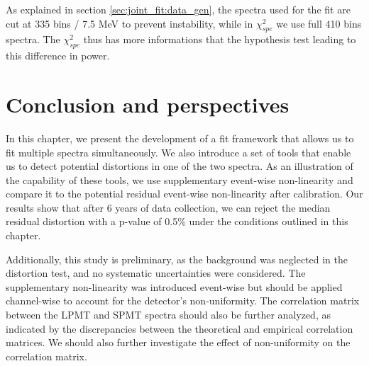 \documentclass[../main.tex]{subfiles}
\begin{document}
As explained in section \ref{sec:joint_fit:data_gen}, the spectra used for the fit are cut at 335 bins / 7.5 MeV to prevent instability, while in $\chi^2_{spe}$ we use full 410 bins spectra. The $\chi^2_{spe}$ thus has more informations that the hypothesis test leading to this difference in power.


%
%
%
%
%

\section{Conclusion and perspectives}
\label{sec:joint_fit:conclusion}

In this chapter, we present the development of a fit framework that allows us to fit multiple spectra simultaneously. We also introduce a set of tools that enable us to detect potential distortions in one of the two spectra. As an illustration of the capability of these tools, we use supplementary event-wise non-linearity and compare it to the potential residual event-wise non-linearity after calibration. Our results show that after 6 years of data collection, we can reject the median residual distortion with a p-value of 0.5\% under the conditions outlined in this chapter.

Additionally, this study is preliminary, as the background was neglected in the distortion test, and no systematic uncertainties were considered. The supplementary non-linearity was introduced event-wise but should be applied channel-wise to account for the detector's non-uniformity. The correlation matrix between the LPMT and SPMT spectra should also be further analyzed, as indicated by the discrepancies between the theoretical and empirical correlation matrices. We should also further investigate the effect of non-uniformity on the correlation matrix.
\end{document}
